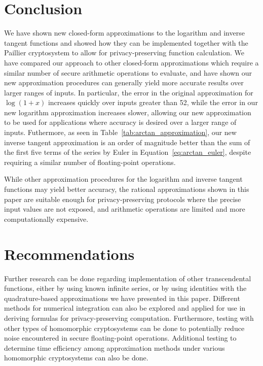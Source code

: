 \section{Conclusion}
We have shown new closed-form approximations to the logarithm and inverse tangent functions and showed how they can be implemented together with the Paillier cryptosystem to allow for privacy-preserving function calculation. We have compared our approach to other closed-form approximations which require a similar number of secure arithmetic operations to evaluate, and have shown our new approximation procedures can generally yield more accurate results over larger ranges of inputs. In particular, the error in the original approximation for $\log{\left(1+x\right)}$ increases quickly over inputs greater than 52, while the error in our new logarithm approximation increases slower, allowing our new approximation to be used for applications where accuracy is desired over a larger range of inputs.
Futhermore, as seen in Table~\ref{tab:arctan_approximation}, our new inverse tangent approximation is an order of magnitude better than the sum of the first five terms of the series by Euler in Equation~\ref{eq:arctan_euler}, despite requiring a similar number of floating-point operations.

While other approximation procedures for the logarithm and inverse tangent functions may yield better accuracy, the rational approximations shown in this paper are suitable enough for privacy-preserving protocols where the precise input values are not exposed, and arithmetic operations are limited and more computationally expensive.

\section{Recommendations}
Further research can be done regarding implementation of other transcendental functions, either by using known infinite series, or by using identities with the quadrature-based approximations we have presented in this paper. Different methods for numerical integration can also be explored and applied for use in deriving formulas for privacy-preserving computation. Furthermore, testing with other types of homomorphic cryptosystems can be done to potentially reduce noise encountered in secure floating-point operations. Additional testing to determine time efficiency among approximation methods under various homomorphic cryptosystems can also be done.
